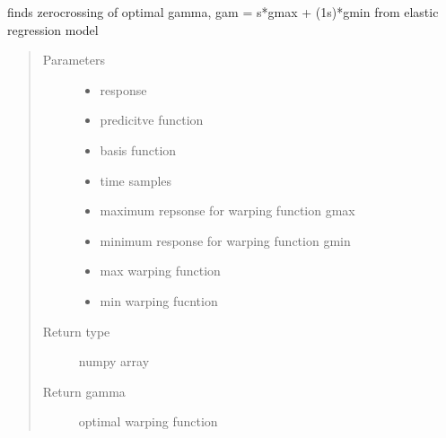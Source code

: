 \documentclass[letterpaper,10pt,english]{sphinxmanual}
\begin{document}
\begin{fulllineitems}
\label{\detokenize{utility_functions:utility_functions.zero_crossing}}
finds zero\sphinxhyphen{}crossing of optimal gamma, gam = s*gmax + (1\sphinxhyphen{}s)*gmin
from elastic regression model
\begin{quote}\begin{description}
\item[{Parameters}] \leavevmode\begin{itemize}
\item {} 
 \textendash{} response

\item {} 
 \textendash{} predicitve function

\item {} 
 \textendash{} basis function

\item {} 
 \textendash{} time samples

\item {} 
 \textendash{} maximum repsonse for warping function gmax

\item {} 
 \textendash{} minimum response for warping function gmin

\item {} 
 \textendash{} max warping function

\item {} 
 \textendash{} min warping fucntion

\end{itemize}

\item[{Return type}] \leavevmode
numpy array

\item[{Return gamma}] \leavevmode
optimal warping function

\end{description}\end{quote}

\end{fulllineitems}
\end{document}
